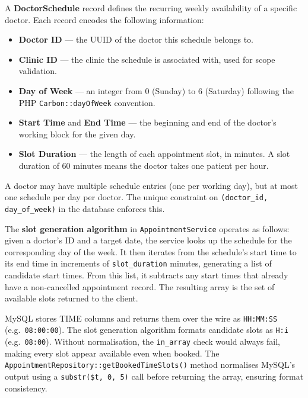 A \textbf{DoctorSchedule} record defines the recurring weekly
availability of a specific doctor. Each record encodes the following
information:

\begin{itemize}
  \item \textbf{Doctor ID} --- the UUID of the doctor this schedule
    belongs to.
  \item \textbf{Clinic ID} --- the clinic the schedule is associated
    with, used for scope validation.
  \item \textbf{Day of Week} --- an integer from 0 (Sunday) to 6
    (Saturday) following the PHP \texttt{Carbon::dayOfWeek} convention.
  \item \textbf{Start Time} and \textbf{End Time} --- the beginning and
    end of the doctor's working block for the given day.
  \item \textbf{Slot Duration} --- the length of each appointment slot,
    in minutes. A slot duration of 60 minutes means the doctor takes
    one patient per hour.
\end{itemize}

A doctor may have multiple schedule entries (one per working day), but
at most one schedule per day per doctor. The unique constraint on
\texttt{(doctor\_id, day\_of\_week)} in the database enforces this.

The \textbf{slot generation algorithm} in \texttt{AppointmentService}
operates as follows: given a doctor's ID and a target date, the service
looks up the schedule for the corresponding day of the week. It then
iterates from the schedule's start time to its end time in increments
of \texttt{slot\_duration} minutes, generating a list of candidate
start times. From this list, it subtracts any start times that already
have a non-cancelled appointment record. The resulting array is the set
of available slots returned to the client.

\begin{tipbox}
  MySQL stores TIME columns and returns them over the wire as
  \texttt{HH:MM:SS} (e.g.\ \texttt{08:00:00}). The slot generation
  algorithm formats candidate slots as \texttt{H:i} (e.g.\
  \texttt{08:00}). Without normalisation, the \texttt{in\_array}
  check would always fail, making every slot appear available even
  when booked. The \texttt{AppointmentRepository::getBookedTimeSlots()}
  method normalises MySQL's output using a \texttt{substr(\$t, 0, 5)}
  call before returning the array, ensuring format consistency.
\end{tipbox}

